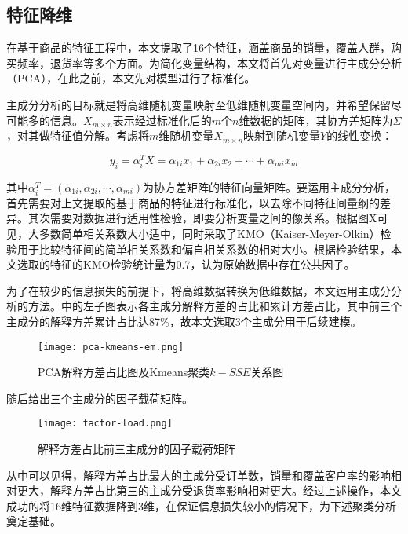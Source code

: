 \documentclass[lang=cn,11pt,a4paper,cite=authoryear]{elegantpaper}
\begin{document}
\subsection{特征降维}

在基于商品的特征工程中，本文提取了16个特征，涵盖商品的销量，覆盖人群，购买频率，退货率等多个方面。为简化变量结构，本文将首先对变量进行主成分分析（PCA），在此之前，本文先对模型进行了标准化。

主成分分析的目标就是将高维随机变量映射至低维随机变量空间内，并希望保留尽可能多的信息。$X_{m \times n}$表示经过标准化后的$m$个$n$维数据的矩阵，其协方差矩阵为$\Sigma$，对其做特征值分解。考虑将$m$维随机变量$X_{m \times n}$映射到随机变量$Y$的线性变换：

\begin{equation}
  y_i = \alpha_{i}^T X = \alpha_{1i}x_1 +\alpha_{2i} x_2 + \cdots + \alpha_{mi} x_m
\end{equation}

其中$\alpha_i^T = (\alpha_{1i}, \alpha_{2i}, \cdots, \alpha_{mi})$为协方差矩阵的特征向量矩阵。要运用主成分分析，首先需要对上文提取的基于商品的特征进行标准化，以去除不同特征间量纲的差异。其次需要对数据进行适用性检验，即要分析变量之间的像关系。根据图X可见，大多数简单相关系数大小适中，同时采取了KMO（Kaiser-Meyer-Olkin）检验用于比较特征间的简单相关系数和偏自相关系数的相对大小。根据检验结果，本文选取的特征的KMO检验统计量为0.7，认为原始数据中存在公共因子。

为了在较少的信息损失的前提下，将高维数据转换为低维数据，本文运用主成分分析的方法。中的左子图表示各主成分解释方差的占比和累计方差占比，其中前三个主成分的解释方差累计占比达87\%，故本文选取3个主成分用于后续建模。
\begin{figure}[H]
  \centering
  \texttt{[image: pca-kmeans-em.png]}
  \caption{PCA解释方差占比图及Kmeans聚类$k-SSE$关系图}
  \label{主成分聚类}
\end{figure}

随后给出三个主成分的因子载荷矩阵。
\begin{figure}[H]
  \centering
  \texttt{[image: factor-load.png]}
  \caption{解释方差占比前三主成分的因子载荷矩阵}
  \label{因子载荷矩阵}
\end{figure}

从中可以见得，解释方差占比最大的主成分受订单数，销量和覆盖客户率的影响相对更大，解释方差占比第三的主成分受退货率影响相对更大。经过上述操作，本文成功的将16维特征数据降到3维，在保证信息损失较小的情况下，为下述聚类分析奠定基础。
\end{document}
